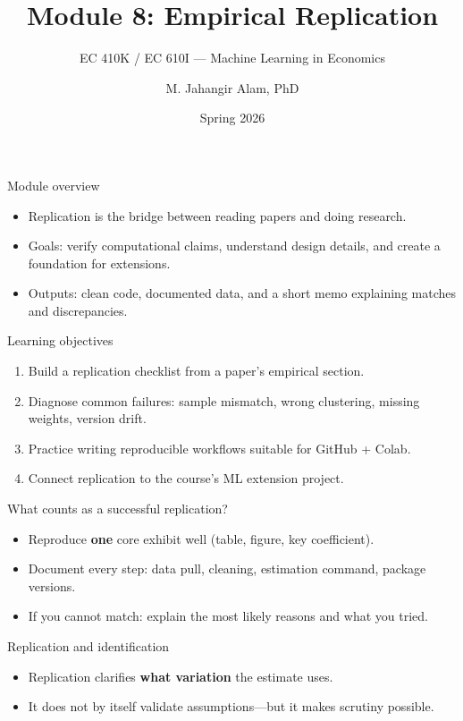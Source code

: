\documentclass[aspectratio=169,11pt]{beamer}
\title[Replication]{Module 8: Empirical Replication}
\subtitle{EC 410K / EC 610I --- Machine Learning in Economics}
\author{M. Jahangir Alam, PhD}
\institute{Wilfrid Laurier University}
\date{Spring 2026}
\begin{document}
\begin{frame}[plain]
  \titlepage
\end{frame}

\begin{frame}{Module overview}
  \begin{itemize}
    \item Replication is the bridge between reading papers and doing research.
    \item Goals: verify computational claims, understand design details, and create a foundation for extensions.
    \item Outputs: clean code, documented data, and a short memo explaining matches and discrepancies.
  \end{itemize}
\end{frame}

\begin{frame}{Learning objectives}
  \begin{enumerate}
    \item Build a replication checklist from a paper’s empirical section.
    \item Diagnose common failures: sample mismatch, wrong clustering, missing weights, version drift.
    \item Practice writing reproducible workflows suitable for GitHub + Colab.
    \item Connect replication to the course’s ML extension project.
  \end{enumerate}
\end{frame}

\begin{frame}{What counts as a successful replication?}
  \begin{itemize}
    \item Reproduce \textbf{one} core exhibit well (table, figure, key coefficient).
    \item Document every step: data pull, cleaning, estimation command, package versions.
    \item If you cannot match: explain the most likely reasons and what you tried.
  \end{itemize}
\end{frame}

\begin{frame}{Replication and identification}
  \begin{itemize}
    \item Replication clarifies \textbf{what variation} the estimate uses.
    \item It does not by itself validate assumptions---but it makes scrutiny possible.
  \end{itemize}
\end{frame}
\end{document}
